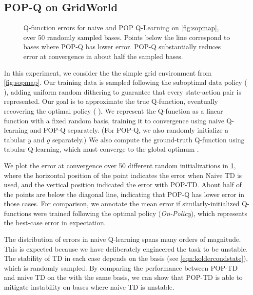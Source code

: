 \subsection{POP-Q on GridWorld}

\label{sec:expsimpleoffpolicy}
\begin{figure}[t]
  \centering
  
  \caption{Q-function errors for naive and POP Q-Learning on \cref{fig:sopmap}, over 50 randomly sampled bases. Points below the line correspond to bases where POP-Q has lower error. POP-Q substantially reduces error at convergence in about half the sampled bases. }
  \label{fig:soperr}
\end{figure}

In this experiment, we consider the the simple grid environment from \cref{fig:sopmap}.
Our training data is sampled following the suboptimal data policy ({\color{datapolicy} \datapolicyglyph}), adding uniform random dithering to guarantee that every state-action pair is represented.
Our goal is to approximate the true Q-function, eventually recovering the optimal policy ({\color{optimpolicy} \optimpolicyglyph}).
We represent the Q-function as a linear function with a fixed random basis, training it to convergence using naive Q-learning and POP-Q separately. (For POP-Q, we also randomly initialize a tabular $y$ and $g$ separately.) We also compute the ground-truth Q-function using tabular Q-learning, which must converge to the global optimum \cite{watkins1992q}.

We plot the error at convergence over 50 different random initializations in \cref{fig:soperr}, where the horizontal position of the point indicates the error when Naive TD is used, and the vertical position indicated the error with POP-TD. About half of the points are below the diagonal line, indicating that POP-Q has lower error in those cases. For comparison, we annotate the mean error if similarly-initialized Q-functions were trained following the optimal policy (\emph{On-Policy}), which represents the best-case error in expectation.

The distribution of errors in naive Q-learning spans many orders of magnitude. This is expected because we have deliberately engineered the task to be unstable. The stability of TD in each case depends on the basis (see \cref{eqn:koldercondstate}), which is randomly sampled. By comparing the performance between POP-TD and naive TD on the with the same basis, we can show that POP-TD is able to mitigate instability on bases where naive TD is unstable.

